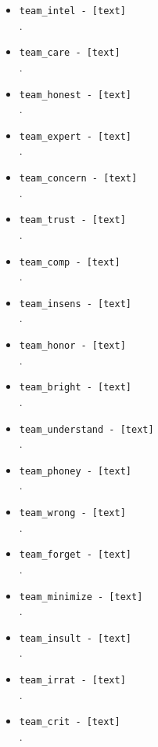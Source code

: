 \begin{description}
\begin{addmargin}[0em]{0em}
\begin{addmargin}[1em]{0em}
\begin{itemize}
            \item \verb|team_intel - [text]|\\.
            \item \verb|team_care - [text]|\\.
            \item \verb|team_honest - [text]|\\.
            \item \verb|team_expert - [text]|\\.
            \item \verb|team_concern - [text]|\\.
            \item \verb|team_trust - [text]|\\.
            \item \verb|team_comp - [text]|\\.
            \item \verb|team_insens - [text]|\\.
            \item \verb|team_honor - [text]|\\.
            \item \verb|team_bright - [text]|\\.
            \item \verb|team_understand - [text]|\\.
            \item \verb|team_phoney - [text]|\\.
            \item \verb|team_wrong - [text]|\\.
            \item \verb|team_forget - [text]|\\.
            \item \verb|team_minimize - [text]|\\.
            \item \verb|team_insult - [text]|\\.
            \item \verb|team_irrat - [text]|\\.
            \item \verb|team_crit - [text]|\\.

\end{itemize}
\end{addmargin}
\end{addmargin}
\end{description}
